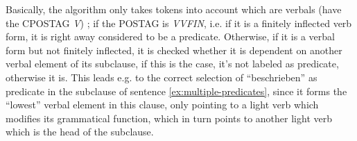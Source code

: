 
Basically, the algorithm only takes tokens into account which are verbals (have the CPOSTAG
\emph{V}) ; if the POSTAG is \emph{VVFIN}, i.e. if it is a finitely inflected verb form,
it is right away considered to be a predicate. Otherwise, if it is a verbal form but not
finitely inflected, it is checked whether it is dependent on another verbal element of its
subclause, if this is the case, it's not labeled as predicate, otherwise it is. This leads
e.g. to the correct selection of ``beschrieben'' as predicate in the subclause of sentence
\ref{ex:multiple-predicates}, since it forms the ``lowest'' verbal element in this clause,
only pointing to a light verb which modifies its grammatical function, which in turn points
to another light verb which is the head of the subclause.



